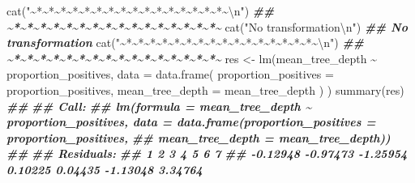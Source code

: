 \documentclass[
  11pt,
  oneside]{book}
\newenvironment{Shaded}{\begin{snugshade}}{\end{snugshade}}
\newcommand{\AttributeTok}[1]{\textcolor[rgb]{0.77,0.63,0.00}{#1}}
\newcommand{\DocumentationTok}[1]{\textcolor[rgb]{0.56,0.35,0.01}{\textbf{\textit{#1}}}}
\newcommand{\FunctionTok}[1]{\textcolor[rgb]{0.00,0.00,0.00}{#1}}
\newcommand{\NormalTok}[1]{#1}
\newcommand{\OtherTok}[1]{\textcolor[rgb]{0.56,0.35,0.01}{#1}}
\newcommand{\SpecialCharTok}[1]{\textcolor[rgb]{0.00,0.00,0.00}{#1}}
\newcommand{\StringTok}[1]{\textcolor[rgb]{0.31,0.60,0.02}{#1}}
\begin{document}
\begin{Shaded}
\begin{Highlighting}[]
\FunctionTok{cat}\NormalTok{(}\StringTok{"\textasciitilde{}*\textasciitilde{}*\textasciitilde{}*\textasciitilde{}*\textasciitilde{}*\textasciitilde{}*\textasciitilde{}*\textasciitilde{}*\textasciitilde{}*\textasciitilde{}*\textasciitilde{}*\textasciitilde{}*\textasciitilde{}*\textasciitilde{}*\textasciitilde{}*\textasciitilde{}*\textasciitilde{}}\SpecialCharTok{\textbackslash{}n}\StringTok{"}\NormalTok{)}
\DocumentationTok{\#\# \textasciitilde{}*\textasciitilde{}*\textasciitilde{}*\textasciitilde{}*\textasciitilde{}*\textasciitilde{}*\textasciitilde{}*\textasciitilde{}*\textasciitilde{}*\textasciitilde{}*\textasciitilde{}*\textasciitilde{}*\textasciitilde{}*\textasciitilde{}*\textasciitilde{}*\textasciitilde{}*\textasciitilde{}}
\FunctionTok{cat}\NormalTok{(}\StringTok{"No transformation}\SpecialCharTok{\textbackslash{}n}\StringTok{"}\NormalTok{)}
\DocumentationTok{\#\# No transformation}
\FunctionTok{cat}\NormalTok{(}\StringTok{"\textasciitilde{}*\textasciitilde{}*\textasciitilde{}*\textasciitilde{}*\textasciitilde{}*\textasciitilde{}*\textasciitilde{}*\textasciitilde{}*\textasciitilde{}*\textasciitilde{}*\textasciitilde{}*\textasciitilde{}*\textasciitilde{}*\textasciitilde{}*\textasciitilde{}*\textasciitilde{}*\textasciitilde{}}\SpecialCharTok{\textbackslash{}n}\StringTok{"}\NormalTok{)}
\DocumentationTok{\#\# \textasciitilde{}*\textasciitilde{}*\textasciitilde{}*\textasciitilde{}*\textasciitilde{}*\textasciitilde{}*\textasciitilde{}*\textasciitilde{}*\textasciitilde{}*\textasciitilde{}*\textasciitilde{}*\textasciitilde{}*\textasciitilde{}*\textasciitilde{}*\textasciitilde{}*\textasciitilde{}*\textasciitilde{}}
\NormalTok{res }\OtherTok{\textless{}{-}} \FunctionTok{lm}\NormalTok{(mean\_tree\_depth }\SpecialCharTok{\textasciitilde{}}\NormalTok{ proportion\_positives,}
  \AttributeTok{data =} \FunctionTok{data.frame}\NormalTok{(}
    \AttributeTok{proportion\_positives =}\NormalTok{ proportion\_positives,}
    \AttributeTok{mean\_tree\_depth =}\NormalTok{ mean\_tree\_depth}
\NormalTok{  )}
\NormalTok{)}
\FunctionTok{summary}\NormalTok{(res)}
\DocumentationTok{\#\# }
\DocumentationTok{\#\# Call:}
\DocumentationTok{\#\# lm(formula = mean\_tree\_depth \textasciitilde{} proportion\_positives, data = data.frame(proportion\_positives = proportion\_positives, }
\DocumentationTok{\#\#     mean\_tree\_depth = mean\_tree\_depth))}
\DocumentationTok{\#\# }
\DocumentationTok{\#\# Residuals:}
\DocumentationTok{\#\#        1        2        3        4        5        6        7 }
\DocumentationTok{\#\# {-}0.12948 {-}0.97473 {-}1.25954  0.10225  0.04435 {-}1.13048  3.34764 }

\end{Highlighting}
\end{Shaded}
\end{document}
